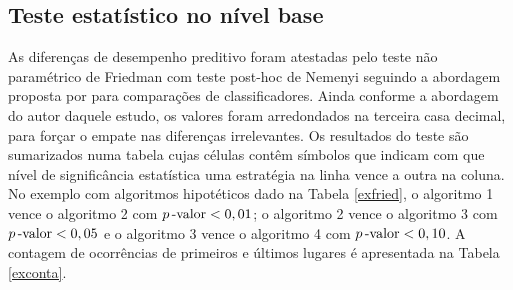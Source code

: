 \subsection{Teste estatístico no nível base}\label{testestbase}
As diferenças de desempenho preditivo foram atestadas pelo teste não paramétrico de Friedman com teste post-hoc de Nemenyi seguindo a abordagem proposta por  para comparações de classificadores.
Ainda conforme a abordagem do autor daquele estudo, os valores foram arredondados na terceira casa decimal, para forçar o empate nas diferenças irrelevantes.
Os resultados do teste são sumarizados numa tabela cujas células contêm símbolos que indicam com que nível de significância estatística uma estratégia na linha vence a outra na coluna.
No exemplo com algoritmos hipotéticos dado na Tabela \ref{exfried}, o algoritmo 1 vence o algoritmo 2 com $p\operatorname*{-valor}<0,01$; o algoritmo 2 vence o algoritmo 3 com $p\operatorname*{-valor}<0,05$ e o algoritmo 3 vence o algoritmo 4 com $p\operatorname*{-valor}<0,10$.
A contagem de ocorrências de primeiros e últimos lugares é apresentada na Tabela \ref{exconta}.
